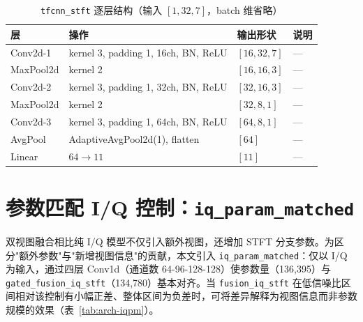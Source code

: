 \begin{table}[htbp]
  \centering
  \caption{\texttt{tfcnn\_stft} 逐层结构（输入 \([1,32,7]\)，batch 维省略）}
  \label{tab:arch-tfcnn}
  \small
  \begin{tabular}{llll}
    \toprule
    层 & 操作 & 输出形状 & 说明 \\
    \midrule
    Conv2d-1  & kernel 3, padding 1, 16ch, BN, ReLU & \([16,32,7]\) & --- \\
    MaxPool2d & kernel 2                              & \([16,16,3]\) & --- \\
    Conv2d-2  & kernel 3, padding 1, 32ch, BN, ReLU & \([32,16,3]\) & --- \\
    MaxPool2d & kernel 2                              & \([32, 8,1]\) & --- \\
    Conv2d-3  & kernel 3, padding 1, 64ch, BN, ReLU & \([64, 8,1]\) & --- \\
    AvgPool   & AdaptiveAvgPool2d(1), flatten         & \([64]\)      & --- \\
    Linear    & \(64 \to 11\)                         & \([11]\)      & --- \\
    \bottomrule
  \end{tabular}
\end{table}

\section{参数匹配 I/Q 控制：\texttt{iq\_param\_matched}}

双视图融合相比纯 I/Q 模型不仅引入额外视图，还增加 STFT 分支参数。为区分"额外参数"与"新增视图信息"的贡献，本文引入 \texttt{iq\_param\_matched}：仅以 I/Q 为输入，通过四层 Conv1d（通道数 64-96-128-128）使参数量（136,395）与 \texttt{gated\_fusion\_iq\_stft}（134,780）基本对齐。当 \texttt{fusion\_iq\_stft} 在低信噪比区间相对该控制有小幅正差、整体区间为负差时，可将差异解释为视图信息而非参数规模的效果（表~\ref{tab:arch-iqpm}）。

